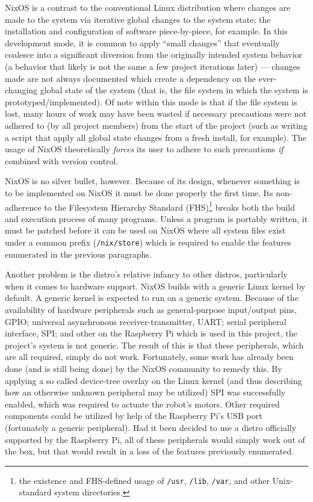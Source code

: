 NixOS is a contrast to the conventional Linux distribution where changes are made to the system via iterative global changes to the system state;
the installation and configuration of software piece-by-piece, for example.
In this development mode, it is common to apply ``small changes'' that eventually coalesce into a significant diversion from the originally intended system behavior (a behavior that likely is not the same a few project iterations later) ---
changes made are not always documented which create a dependency on the ever-changing global state of the system (that is, the file system in which the system is prototyped/implemented).
Of note within this mode is that if the file system is lost,
many hours of work may have been wasted if necessary precautions were not adhered to (by all project members) from the start of the project (such as writing a script that apply all global state changes from a fresh install, for example).
The usage of NixOS theoretically \textit{forces} its user to adhere to such precautions \textit{if} combined with version control.

NixOS is no silver bullet, however.
Because of its design, whenever something is to be implemented on NixOS it must be done properly the first time.
Its non-adherence to the Filesystem Hierarchy Standard (FHS)\footnote{the existence and FHS-defined usage of \texttt{/usr}, \texttt{/lib}, \texttt{/var}, and other Unix-standard system directories.} breaks both the build and execution process of many programs.
Unless a program is portably written, it must be patched before it can be used on NixOS where all system files exist under a common prefix (\texttt{/nix/store}) which is required to enable the features enumerated in the previous paragraphs.

Another problem is the distro's relative infancy to other distros, particularly when it comes to hardware support.
NixOS builds with a generic Linux kernel by default.
A generic kernel is expected to run on a generic system.
Because of the availability of hardware peripherals such as general-purpose input/output pins, GPIO;
universal asynchronous receiver-transmitter, UART;
serial peripheral interface, SPI; and other on the Raspberry Pi which is used in this project, the project's system is not generic.
The result of this is that these peripherals, which are all required, simply do not work.
Fortunately, some work has already been done (and is still being done) by the NixOS community to remedy this.
By applying a so called device-tree overlay on the Linux kernel (and thus describing how an otherwise unknown peripheral may be utilized) SPI was successfully enabled,
which was required to actuate the robot's motors.
Other required components could be utilized by help of the Raspberry Pi's USB port (fortunately a generic peripheral).
Had it been decided to use a distro officially supported by the Raspberry Pi,
all of these peripherals would simply work out of the box,
but that would result in a loss of the features previously enumerated.

